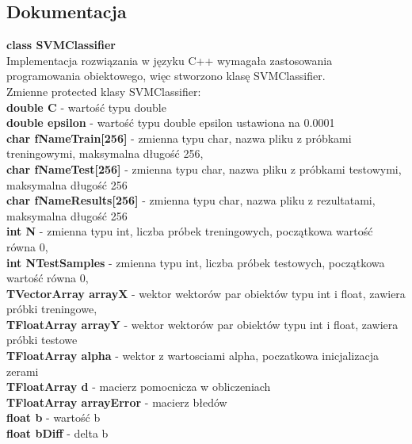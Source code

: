 \documentclass[[10pt,a4paper]{article}
\begin{document}
\begin{enumerate}
\subsection{Dokumentacja}

\textbf{class SVMClassifier}\\ Implementacja rozwiązania w języku C++ wymagała zastosowania programowania obiektowego, więc stworzono klasę SVMClassifier. \\

Zmienne protected klasy SVMClassifier:\\
\textbf{double C} - wartość typu double\\
\textbf{double epsilon} - wartość typu double epsilon ustawiona na 0.0001\\
\textbf{char fNameTrain[256]} - zmienna typu char, nazwa pliku z próbkami treningowymi, maksymalna długość 256,\\
\textbf{char fNameTest[256]} -  zmienna typu char, nazwa pliku z próbkami testowymi, maksymalna długość 256\\
\textbf{char fNameResults[256]} -  zmienna typu char, nazwa pliku z rezultatami, maksymalna długość 256\\  
\textbf{int N }- zmienna typu int, liczba próbek treningowych, początkowa wartość równa 0,\\
\textbf{int NTestSamples} - zmienna typu int, liczba próbek testowych, początkowa wartość równa 0,\\
\textbf{TVectorArray arrayX} - wektor wektorów par obiektów typu int i float, zawiera próbki treningowe,\\
\textbf{TFloatArray arrayY }- wektor wektorów par obiektów typu int i float, zawiera próbki testowe\\
\textbf{TFloatArray alpha} - wektor z wartosciami alpha, poczatkowa inicjalizacja zerami\\
\textbf{TFloatArray d }- macierz pomocnicza w obliczeniach\\
\textbf{TFloatArray arrayError }- macierz błedów \\
\textbf{float b }- wartość b\\
\textbf{float bDiff }- delta b\\


\end{enumerate}
\end{document}
